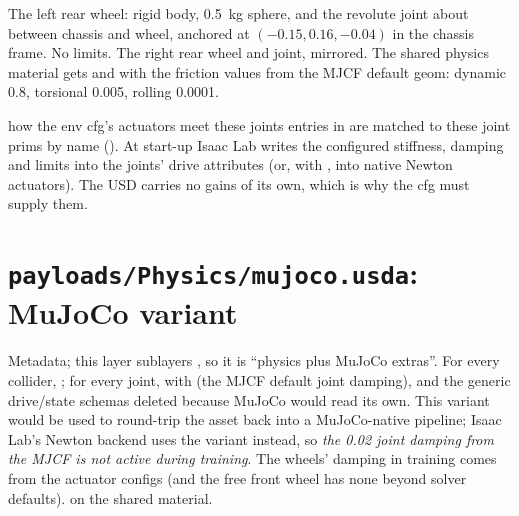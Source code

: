 
\begin{explain}
 The left rear wheel: rigid body, 0.5~kg sphere, and the
   revolute joint about  between chassis and wheel,
  anchored at $(-0.15, 0.16, -0.04)$ in the chassis frame. No limits.
 The right rear wheel and  joint, mirrored.
 The shared physics material gets  and
   with the friction values from the MJCF default
  geom: dynamic 0.8, torsional 0.005, rolling 0.0001.
\end{explain}

\begin{isaacbox}{how the env cfg's actuators meet these joints}
 entries in  are matched
to these joint prims by name (). At start-up Isaac Lab
writes the configured stiffness, damping and limits into the joints' drive
attributes (or, with , into native Newton
actuators). The USD carries no gains of its own, which is why the cfg must
supply them.
\end{isaacbox}

\section{\texttt{payloads/Physics/mujoco.usda}: MuJoCo variant}


\begin{explain}
 Metadata; this layer sublayers , so it is
  ``physics plus MuJoCo extras''.
 For every collider, ; for every joint,
   with  (the MJCF default joint
  damping), and the generic drive/state schemas deleted because MuJoCo would
  read its own. This variant would be used to round-trip the asset back into
  a MuJoCo-native pipeline; Isaac Lab's Newton backend uses the
   variant instead, so \emph{the 0.02 joint damping from the
  MJCF is not active during training}. The wheels' damping in training comes
  from the actuator configs (and the free front wheel has none beyond
  solver defaults).
  on the shared material.
\end{explain}


